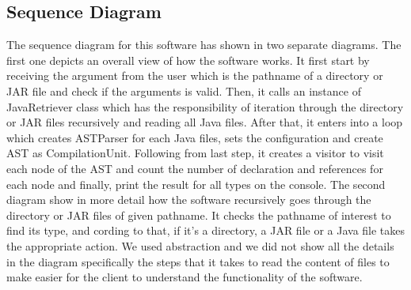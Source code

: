 \documentclass[12p]{article}
\begin{document}
\subsection{Sequence Diagram}
The sequence diagram for this software has shown in two separate diagrams. The first one depicts an overall view of how the software works. It first start by receiving the argument from the user which is the pathname of a directory or JAR file and check if the arguments is valid. Then, it calls an instance of JavaRetriever class which has the responsibility of iteration through the directory or JAR files recursively and reading all Java files. After that, it enters into a loop which creates ASTParser for each Java files, sets the configuration and create AST as CompilationUnit. Following from last step, it creates a visitor to visit each node of the AST and count the number of declaration and references for each node and finally, print the result for all types on the console. The second diagram show in more detail how the software recursively goes through the directory or JAR files of given pathname. It checks the pathname of interest to find its type, and cording to that, if it's a directory, a JAR file or a Java file takes the appropriate action. We used abstraction and we did not show all the details in the diagram specifically the steps that it takes to read the content of files to make easier for the client to understand the functionality of the software.
\end{document}
